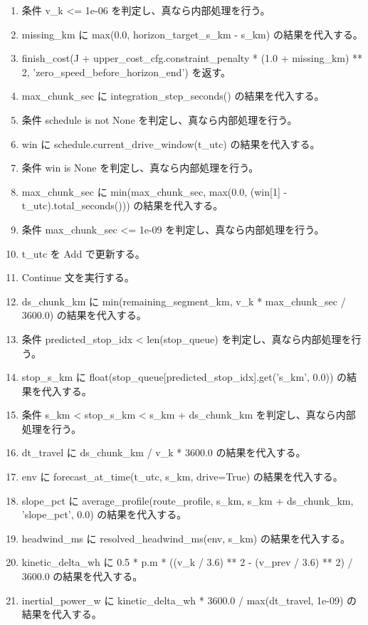 \documentclass[a4paper,11pt]{article}
\begin{document}
\begin{enumerate}[leftmargin=1.8em]
\item     条件 v\_k <= 1e-06 を判定し、真なら内部処理を行う。
\item       missing\_km に max(0.0, horizon\_target\_s\_km - s\_km) の結果を代入する。
\item       finish\_cost(J + upper\_cost\_cfg.constraint\_penalty * (1.0 + missing\_km) ** 2, 'zero\_speed\_before\_horizon\_end') を返す。
\item     max\_chunk\_sec に integration\_step\_seconds() の結果を代入する。
\item     条件 schedule is not None を判定し、真なら内部処理を行う。
\item       win に schedule.current\_drive\_window(t\_utc) の結果を代入する。
\item       条件 win is None を判定し、真なら内部処理を行う。
\item       max\_chunk\_sec に min(max\_chunk\_sec, max(0.0, (win[1] - t\_utc).total\_seconds())) の結果を代入する。
\item     条件 max\_chunk\_sec <= 1e-09 を判定し、真なら内部処理を行う。
\item       t\_utc を Add で更新する。
\item       Continue 文を実行する。
\item     ds\_chunk\_km に min(remaining\_segment\_km, v\_k * max\_chunk\_sec / 3600.0) の結果を代入する。
\item     条件 predicted\_stop\_idx < len(stop\_queue) を判定し、真なら内部処理を行う。
\item       stop\_s\_km に float(stop\_queue[predicted\_stop\_idx].get('s\_km', 0.0)) の結果を代入する。
\item       条件 s\_km < stop\_s\_km < s\_km + ds\_chunk\_km を判定し、真なら内部処理を行う。
\item     dt\_travel に ds\_chunk\_km / v\_k * 3600.0 の結果を代入する。
\item     env に forecast\_at\_time(t\_utc, s\_km, drive=True) の結果を代入する。
\item     slope\_pct に average\_profile(route\_profile, s\_km, s\_km + ds\_chunk\_km, 'slope\_pct', 0.0) の結果を代入する。
\item     headwind\_ms に resolved\_headwind\_ms(env, s\_km) の結果を代入する。
\item     kinetic\_delta\_wh に 0.5 * p.m * ((v\_k / 3.6) ** 2 - (v\_prev / 3.6) ** 2) / 3600.0 の結果を代入する。
\item     inertial\_power\_w に kinetic\_delta\_wh * 3600.0 / max(dt\_travel, 1e-09) の結果を代入する。

\end{enumerate}
\end{document}
